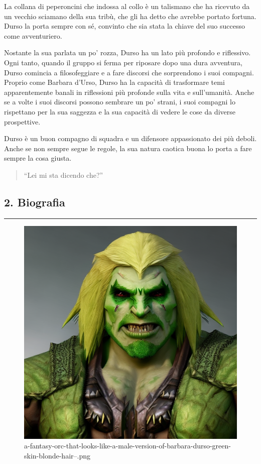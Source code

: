 La collana di peperoncini che indossa al collo è un talismano che ha
ricevuto da un vecchio sciamano della sua tribù, che gli ha detto che
avrebbe portato fortuna. Durso la porta sempre con sé, convinto che sia
stata la chiave del suo successo come avventuriero.

Nostante la sua parlata un po' rozza, Durso ha un lato più profondo e
riflessivo. Ogni tanto, quando il gruppo si ferma per riposare dopo una
dura avventura, Durso comincia a filosofeggiare e a fare discorsi che
sorprendono i suoi compagni. Proprio come Barbara d'Urso, Durso ha la
capacità di trasformare temi apparentemente banali in riflessioni più
profonde sulla vita e sull'umanità. Anche se a volte i suoi discorsi
possono sembrare un po' strani, i suoi compagni lo rispettano per la sua
saggezza e la sua capacità di vedere le cose da diverse prospettive.

Durso è un buon compagno di squadra e un difensore appassionato dei più
deboli. Anche se non sempre segue le regole, la sua natura caotica buona
lo porta a fare sempre la cosa giusta.

\begin{quote}
``Lei mi sta dicendo che?''
\end{quote}

\subsection{2. Biografia}\label{biografia}

\begin{center}\rule{0.5\linewidth}{0.5pt}\end{center}

\begin{figure}
\centering
\includegraphics{a-fantasy-orc-that-looks-like-a-male-version-of-barbara-durso-green-skin-blonde-hair--.png}
\caption{a-fantasy-orc-that-looks-like-a-male-version-of-barbara-durso-green-skin-blonde-hair--.png}
\end{figure}

